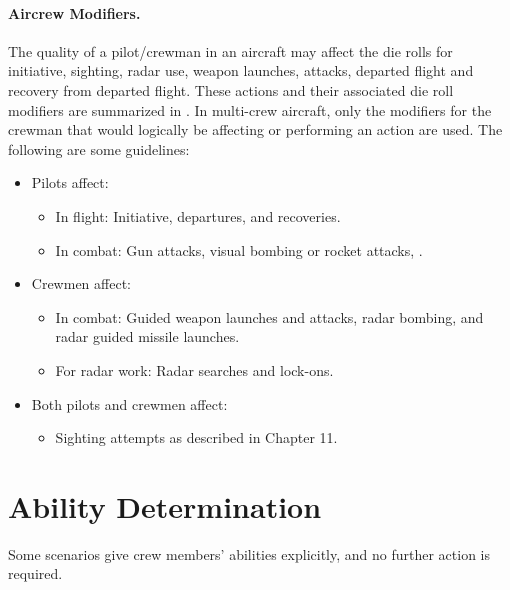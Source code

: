 \begin{advancedrules}
{\paragraph{Aircrew Modifiers.} The quality of a pilot/crewman in an aircraft may affect the die rolls for initiative, sighting, radar use, weapon launches, attacks, departed flight and recovery from departed flight. These actions and their associated die roll modifiers are summarized in . In multi-crew aircraft, only the modifiers for the crewman that would logically be affecting or performing an action are used. The following are some guidelines:

\begin{itemize}
\item Pilots affect:
\begin{itemize}
    \item In flight: Initiative, departures, and recoveries.
    \item In combat: Gun attacks, visual bombing or rocket attacks, .
\end{itemize}

\item Crewmen affect:
\begin{itemize}
    \item In combat: Guided weapon launches and attacks, radar bombing, and radar guided missile launches.
    \item For radar work:  Radar searches and lock-ons.
\end{itemize}

\item Both pilots and crewmen affect:
\begin{itemize}
    \item Sighting attempts as described in Chapter 11.
\end{itemize}
\end{itemize}

}{

\section{Ability Determination}
\label{rule:crew-determination}

Some scenarios give crew members’ abilities explicitly, and no further action is required.

}
\end{advancedrules}
